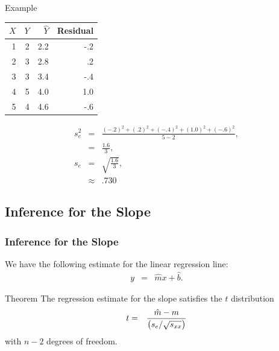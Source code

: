 \begin{frame}{Example}

  \begin{tabular}{r|r|r|r}
    $X$ & $Y$ & $\hat{Y}$ & Residual \\ \hline
    1 & 2 & 2.2 & -.2 \\
    2 & 3 & 2.8 &  .2 \\
    3 & 3 & 3.4 & -.4 \\
    4 & 5 & 4.0 & 1.0  \\
    5 & 4 & 4.6 & -.6
  \end{tabular}

  \begin{eqnarray*}
    s^2_e & = & \frac{ (-.2)^2 + (.2)^2 + (-.4)^2 + (1.0)^2 + (-.6)^2}{5-2}, \\
    & = & \frac{1.6}{3}, \\
    s_e & = & \sqrt{\frac{1.6}{3}}, \\
    & \approx & .730
  \end{eqnarray*}
  
\end{frame}
  

\subsection{Inference for the Slope}

\begin{frame}
  \frametitle{Inference for the Slope}

  We have the following estimate for the linear regression line:
  \begin{eqnarray*}
    y & = & \hat{m} x + \hat{b}.
  \end{eqnarray*}

  \begin{block}{Theorem}
    The regression estimate for the slope satisfies the $t$ distribution
    \begin{eqnarray*}
      t & = & \frac{\hat{m}-m}{\left( s_e/\sqrt{s_{xx}} \right)}
    \end{eqnarray*}
    with $n-2$ degrees of freedom.
  \end{block}

\end{frame}


